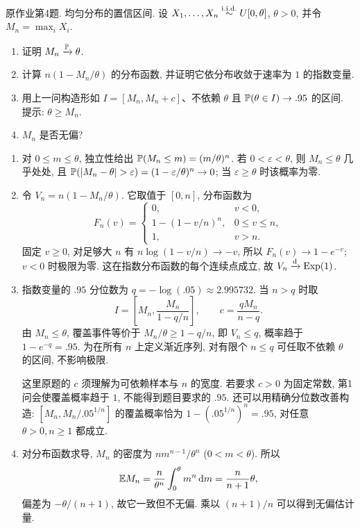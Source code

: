 \begin{exercise}\label{ps02:p04}
原作业第4题. 均匀分布的置信区间. 设 $X_1,\ldots,X_n\stackrel{\mathrm{i.i.d.}}{\sim} U[0,\theta]$, $\theta>0$, 并令 $M_n=\max_iX_i$.
\begin{enumerate}[label=\arabic*.]
\item 证明 $M_n\xrightarrow{\mathbb P}\theta$.
\item 计算 $n(1-M_n/\theta)$ 的分布函数, 并证明它依分布收敛于速率为 $1$ 的指数变量.
\item 用上一问构造形如 $I=[M_n,M_n+c]$、不依赖 $\theta$ 且 $\mathbb P(\theta\in I)\to.95$ 的区间. 提示: $\theta\ge M_n$.
\item $M_n$ 是否无偏?
\end{enumerate}
\end{exercise}
\begin{solution}
\begin{enumerate}[label=\arabic*.]
\item 对 $0\le m\le\theta$, 独立性给出 $\mathbb P(M_n\le m)=(m/\theta)^n$. 若 $0<\varepsilon<\theta$, 则 $M_n\le\theta$ 几乎处处, 且
$\PP(|M_n-\theta|>\varepsilon)=(1-\varepsilon/\theta)^n\to0$;
当 $\varepsilon\ge\theta$ 时该概率为零.
\item 令 $V_n=n(1-M_n/\theta)$. 它取值于 $[0,n]$, 分布函数为
\[
F_n(v)=\begin{cases}
0,&v<0,\\
1-(1-v/n)^n,&0\le v\le n,\\
1,&v>n.
\end{cases}
\]
固定 $v\ge0$, 对足够大 $n$ 有 $n\log(1-v/n)\to-v$, 所以 $F_n(v)\to1-e^{-v}$; $v<0$ 时极限为零. 这在指数分布函数的每个连续点成立, 故 $V_n\xrightarrow{\mathrm d}\operatorname{Exp}(1)$.
\item 指数变量的 $.95$ 分位数为 $q=-\log(.05)\approx2.995732$. 当 $n>q$ 时取
\[
I=\left[M_n,\frac{M_n}{1-q/n}\right],\qquad
c=\frac{qM_n}{n-q}.
\]
由 $M_n\le\theta$, 覆盖事件等价于 $M_n/\theta\ge1-q/n$, 即 $V_n\le q$, 概率趋于 $1-e^{-q}=.95$. 为在所有 $n$ 上定义渐近序列, 对有限个 $n\le q$ 可任取不依赖 $\theta$ 的区间, 不影响极限.

这里原题的 $c$ 须理解为可依赖样本与 $n$ 的宽度. 若要求 $c>0$ 为固定常数, 第1问会使覆盖概率趋于 $1$, 不能得到题目要求的 $.95$. 还可以用精确分位数改善构造: $[M_n,M_n/.05^{1/n}]$ 的覆盖概率恰为 $1-(.05^{1/n})^n=.95$, 对任意 $\theta>0,n\ge1$ 都成立.
\item 对分布函数求导, $M_n$ 的密度为 $nm^{n-1}/\theta^n$ ($0<m<\theta$). 所以
\[
\mathbb E M_n=\frac n{\theta^n}\int_0^\theta m^n\,\mathrm d m
=\frac n{n+1}\theta,
\]
偏差为 $-\theta/(n+1)$, 故它一致但不无偏. 乘以 $(n+1)/n$ 可以得到无偏估计量.
\end{enumerate}
\end{solution}
